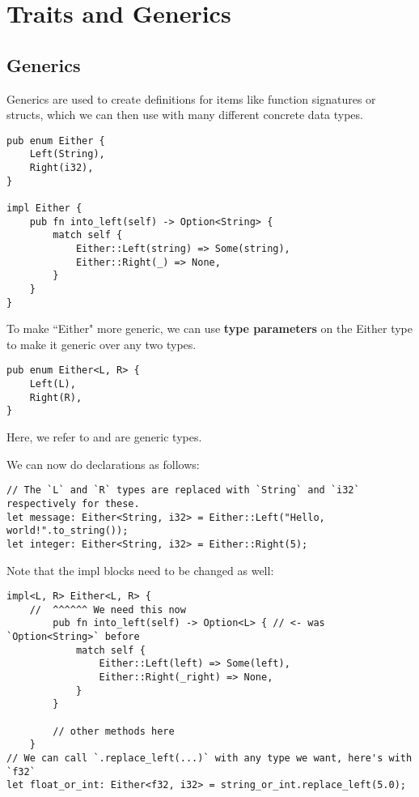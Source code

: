 \section{Traits and Generics}

\subsection{Generics} Generics are used to create definitions for items like function signatures or structs, which we can then use with many different concrete data types.

\begin{lstlisting}[frame = none]
pub enum Either {
    Left(String),
    Right(i32),
}

impl Either {
    pub fn into_left(self) -> Option<String> {
        match self {
            Either::Left(string) => Some(string),
            Either::Right(_) => None,
        }
    }
}
\end{lstlisting}

To make ``Either" more generic, we can use \textbf{type parameters} on the Either type to make it generic over any two types. \\

\begin{lstlisting}[frame = none]
pub enum Either<L, R> {
    Left(L),
    Right(R),
}
\end{lstlisting}
\begin{definition}
Here, we refer to  and  are generic types.
\end{definition}

We can now do declarations as follows:
\begin{lstlisting}[frame = none]
// The `L` and `R` types are replaced with `String` and `i32` respectively for these.
let message: Either<String, i32> = Either::Left("Hello, world!".to_string());
let integer: Either<String, i32> = Either::Right(5);
\end{lstlisting}

Note that the impl blocks need to be changed as well:
\begin{lstlisting}[frame = none]
impl<L, R> Either<L, R> {
    //  ^^^^^^ We need this now
        pub fn into_left(self) -> Option<L> { // <- was `Option<String>` before
            match self {
                Either::Left(left) => Some(left),
                Either::Right(_right) => None,
            }
        }
    
        // other methods here
    } 
// We can call `.replace_left(...)` with any type we want, here's with `f32`
let float_or_int: Either<f32, i32> = string_or_int.replace_left(5.0);
\end{lstlisting}

